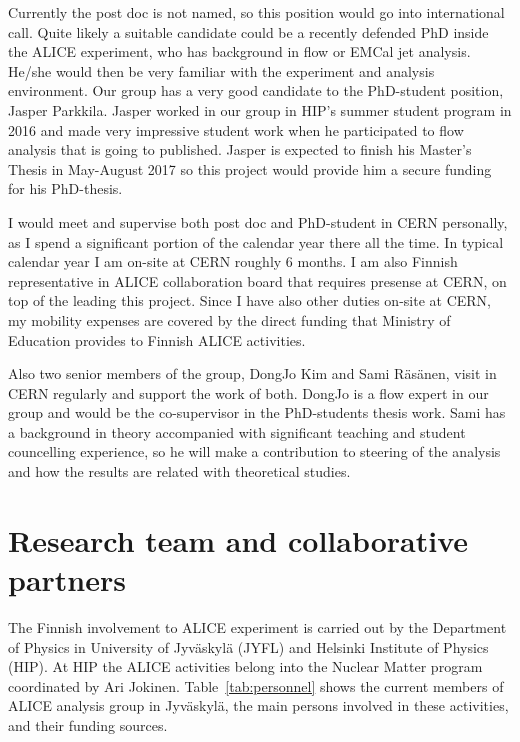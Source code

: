 Currently the post doc is not named, so this position would go into international call. Quite likely a suitable candidate could be a recently defended PhD inside the ALICE experiment, who has background in flow or EMCal jet analysis. He/she would then be very familiar with the experiment and analysis environment. Our group has a very good candidate to the PhD-student position, Jasper Parkkila. Jasper worked in our group in HIP's summer student program in 2016 and made very impressive student work when he participated to flow analysis that is going to published. Jasper is expected to finish his Master's Thesis in May-August 2017 so this project would provide him a secure funding for his PhD-thesis.

I would meet and supervise both post doc and PhD-student in CERN personally, as I spend a significant portion of the calendar year there all the time. In typical calendar year I am on-site at CERN roughly 6 months. I am also Finnish representative in ALICE collaboration board that requires presense at CERN, on top of the leading this project. Since I have also other duties on-site at CERN, my mobility expenses are covered by the direct funding that Ministry of Education provides to Finnish ALICE activities.

Also two senior members of the group, DongJo Kim and Sami R\"as\"anen, visit in CERN regularly and support the work of both. DongJo is a flow expert in our group and would be the co-supervisor in the PhD-students thesis work. Sami has a background in theory accompanied with significant teaching and student councelling experience, so he will make a contribution to steering of the analysis and how the results are related with theoretical studies.

\section{Research team and collaborative partners} %
\label{sec:reseachteam}

The Finnish involvement to ALICE experiment is carried out by the Department of Physics in University of Jyv\"askyl\"a (JYFL) and Helsinki Institute of Physics (HIP). At HIP the ALICE activities belong into the Nuclear Matter program coordinated by Ari Jokinen. Table~\ref{tab:personnel} shows the current members of ALICE analysis group in Jyv\"askyl\"a, the main persons involved in these activities, and their funding sources.

